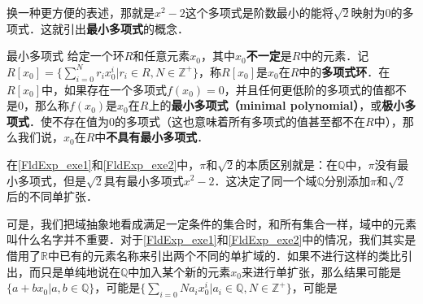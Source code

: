 换一种更方便的表述，那就是$x^2-2$这个多项式是阶数最小的能将$\sqrt{2}$映射为$0$的多项式．这就引出\textbf{最小多项式}的概念．

\begin{definition}{最小多项式}
给定一个环$R$和任意元素$x_0$，其中$x_0$\textbf{不一定}是$R$中的元素．记
$R[x_0]=\{\sum_{i=0}^N r_ix_0^i|r_i\in R, N\in\mathbb{Z}^+\}$，称$R[x_0]$是$x_0$在$R$中的\textbf{多项式环}．在$R[x_0]$中，如果存在一个多项式$f(x_0)=0$，并且任何更低阶的多项式的值都不是$0$，那么称$f(x_0)$是$x_0$在$R$上的\textbf{最小多项式（minimal polynomial）}，或\textbf{极小多项式}．使不存在值为$0$的多项式（这也意味着所有多项式的值甚至都不在$R$中），那么我们说，$x_0$在$R$中\textbf{不具有最小多项式}．
\end{definition}

在\autoref{FldExp_exe1}和\autoref{FldExp_exe2}中，$\pi$和$\sqrt{2}$的本质区别就是：在$\mathbb{Q}$中，$\pi$没有最小多项式，但是$\sqrt{2}$具有最小多项式$x^2-2$．这决定了同一个域$\mathbb{Q}$分别添加$\pi$和$\sqrt{2}$后的不同单扩张．

可是，我们把域抽象地看成满足一定条件的集合时，和所有集合一样，域中的元素叫什么名字并不重要．对于\autoref{FldExp_exe1}和\autoref{FldExp_exe2}中的情况，我们其实是借用了$\mathbb{R}$中已有的元素名称来引出两个不同的单扩域的．如果不进行这样的类比引出，而只是单纯地说在$\mathbb{Q}$中加入某个新的元素$x_0$来进行单扩张，那么结果可能是$\{a+bx_0|a, b\in\mathbb{Q}\}$，可能是$\{\sum_{i=0}N a_ix_0^i|a_i\in\mathbb{Q}, N\in\mathbb{Z}^+\}$，可能是




